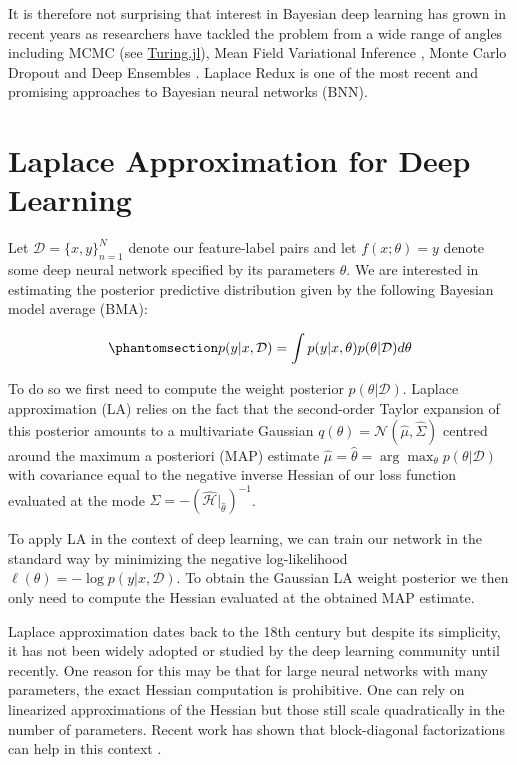 \documentclass{juliacon}
\begin{document}
It is therefore not surprising that interest in Bayesian deep learning
has grown in recent years as researchers have tackled the problem from a
wide range of angles including MCMC (see
\href{https://turing.ml/dev/tutorials/03-bayesian-neural-network/}{Turing.jl}),
Mean Field Variational Inference \cite{blundell2015weight}, Monte Carlo
Dropout \cite{gal2016dropout} and Deep Ensembles
\cite{lakshminarayanan2016simple}. Laplace Redux
\cite{immer2020improving,daxberger2021laplace} is one of the most recent
and promising approaches to Bayesian neural networks (BNN).

\section{Laplace Approximation for Deep Learning}\label{sec-body}

Let \(\mathcal{D}=\{x,y\}_{n=1}^N\) denote our feature-label pairs and
let \(f(x;\theta)=y\) denote some deep neural network specified by its
parameters \(\theta\). We are interested in estimating the posterior
predictive distribution given by the following Bayesian model average
(BMA):

\begin{equation}\phantomsection\label{eq-bma}{
p(y|x,\mathcal{D}) = \int p(y|x,\theta)p(\theta|\mathcal{D})d\theta
}\end{equation}

To do so we first need to compute the weight posterior
\(p(\theta|\mathcal{D})\). Laplace approximation (LA) relies on the fact
that the second-order Taylor expansion of this posterior amounts to a
multivariate Gaussian \(q(\theta)=\mathcal{N}(\hat\mu,\hat\Sigma)\)
centred around the maximum a posteriori (MAP) estimate
\(\hat\mu=\hat{\theta}=\arg\max_{\theta}p(\theta|\mathcal{D})\) with
covariance equal to the negative inverse Hessian of our loss function
evaluated at the mode
\(\hat{\Sigma}=-(\hat{\mathcal{H}}|_{\hat{\theta}})^{-1}\).

To apply LA in the context of deep learning, we can train our network in
the standard way by minimizing the negative log-likelihood
\(\ell(\theta)=-\log p(y|x,\mathcal{D})\). To obtain the Gaussian LA
weight posterior we then only need to compute the Hessian evaluated at
the obtained MAP estimate.

Laplace approximation dates back to the 18th century but despite its
simplicity, it has not been widely adopted or studied by the deep
learning community until recently. One reason for this may be that for
large neural networks with many parameters, the exact Hessian
computation is prohibitive. One can rely on linearized approximations of
the Hessian but those still scale quadratically in the number of
parameters. Recent work has shown that block-diagonal factorizations can
help in this context \cite{martens2015optimizing}.
\end{document}
